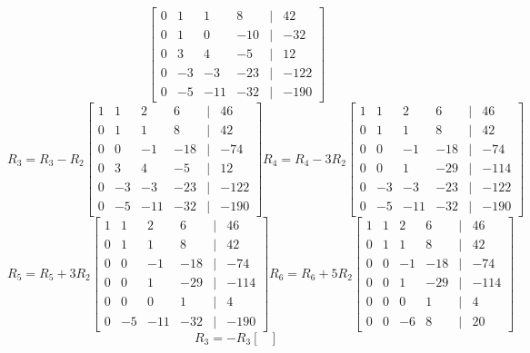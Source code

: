 \documentclass[11pt]{article}
\begin{document}
\begin{enumerate}
\begin{enumerate}
\[\begin{bmatrix}
        0 & 1 & 1 & 8 &|& 42 \\
        0 & 1 & 0 & -10 &|& -32 \\
        0 & 3 & 4 & -5 &|& 12 \\
        0 & -3 & -3 & -23 &|& -122 \\
        0 & -5 & -11 & -32 &|& -190
    \end{bmatrix}
\]
\[
    R_3 = R_3 - R_2
    \begin{bmatrix}
        1 & 1 & 2 & 6 &|& 46 \\
        0 & 1 & 1 & 8 &|& 42 \\
        0 & 0 & -1 & -18 &|& -74 \\
        0 & 3 & 4 & -5 &|& 12 \\
        0 & -3 & -3 & -23 &|& -122 \\
        0 & -5 & -11 & -32 &|& -190
    \end{bmatrix}
    R_4 = R_4 - 3R_2
    \begin{bmatrix}
        1 & 1 & 2 & 6 &|& 46 \\
        0 & 1 & 1 & 8 &|& 42 \\
        0 & 0 & -1 & -18 &|& -74 \\
        0 & 0 & 1 & -29 &|& -114 \\
        0 & -3 & -3 & -23 &|& -122 \\
        0 & -5 & -11 & -32 &|& -190
    \end{bmatrix}
\]
\[
    R_5 = R_5 + 3R_2
    \begin{bmatrix}
        1 & 1 & 2 & 6 &|& 46 \\
        0 & 1 & 1 & 8 &|& 42 \\
        0 & 0 & -1 & -18 &|& -74 \\
        0 & 0 & 1 & -29 &|& -114 \\
        0 & 0 & 0 & 1 &|& 4 \\
        0 & -5 & -11 & -32 &|& -190
    \end{bmatrix}
    R_6 = R_6 + 5R_2
    \begin{bmatrix}
        1 & 1 & 2 & 6 &|& 46 \\
        0 & 1 & 1 & 8 &|& 42 \\
        0 & 0 & -1 & -18 &|& -74 \\
        0 & 0 & 1 & -29 &|& -114 \\
        0 & 0 & 0 & 1 &|& 4 \\
        0 & 0 & -6 & 8 &|& 20
    \end{bmatrix}
\]
\[
    R_3 = -R_3
    \begin{bmatrix}

\end{bmatrix}\]
\end{enumerate}
\end{enumerate}
\end{document}
